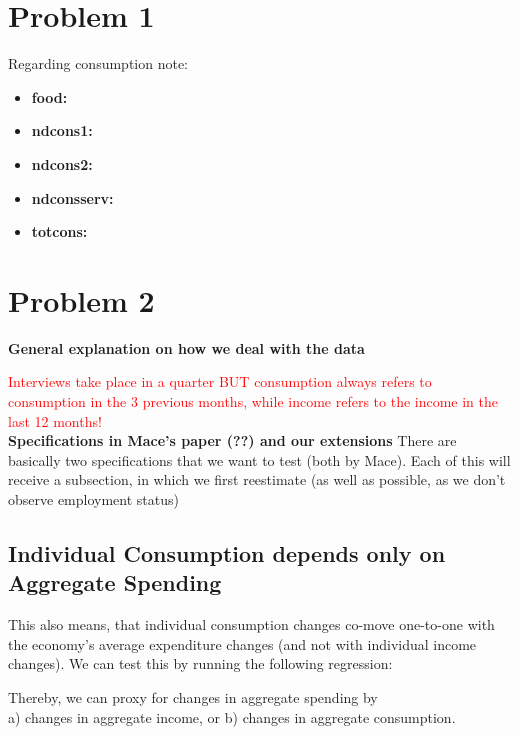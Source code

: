 \documentclass[12pt,a4paper]{article}
\begin{document}
\newpage


\section*{Problem 1}

Regarding consumption note:
\begin{itemize}
    \item \textbf{food:} 
    \item \textbf{ndcons1:} 
    \item \textbf{ndcons2:} 
    \item \textbf{ndconsserv:} 
    \item \textbf{totcons:} 
\end{itemize}


\section*{Problem 2}

\textbf{General explanation on how we deal with the data}

\textcolor{red}{Interviews take place in a quarter BUT consumption always refers to consumption in the 3 previous months, while income refers to the income in the last 12 months!} \\

\textbf{Specifications in Mace's paper (??) and our extensions}
There are basically two specifications that we want to test (both by Mace). Each of this will receive a subsection, in which we first reestimate (as well as possible, as we don't observe employment status) 

\subsection*{Individual Consumption depends only on Aggregate Spending}

This also means, that individual consumption changes co-move one-to-one with the economy's average expenditure changes (and not with individual income changes). We can test this by running the following regression:


Thereby, we can proxy for changes in aggregate spending by \\
a) changes in aggregate income, or
b) changes in aggregate consumption.
\end{document}
